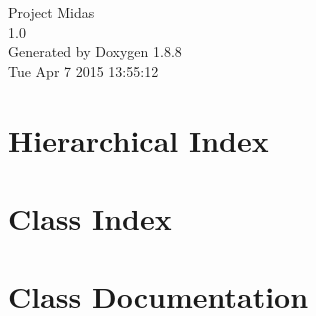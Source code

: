 \documentclass[twoside]{book}
\newcommand{\+}{\discretionary{\mbox{\scriptsize$\hookleftarrow$}}{}{}}
\newcommand{\clearemptydoublepage}{%
  \newpage{\pagestyle{empty}\cleardoublepage}%
}
\begin{document}
\hypersetup{pageanchor=false,
             bookmarks=true,
             bookmarksnumbered=true,
             pdfencoding=unicode
            }
\begin{titlepage}
\vspace*{7cm}
\begin{center}%
{\Large Project Midas \\[1ex]\large 1.\+0 }\\
\vspace*{1cm}
{\large Generated by Doxygen 1.8.8}\\
\vspace*{0.5cm}
{\small Tue Apr 7 2015 13:55:12}\\
\end{center}
\end{titlepage}
\clearemptydoublepage
\tableofcontents
\clearemptydoublepage
{}
\hypersetup{pageanchor=true}

\chapter{Hierarchical Index}

\chapter{Class Index}

\chapter{Class Documentation}






















































\newpage
{}
{}
\printindex
\end{document}

